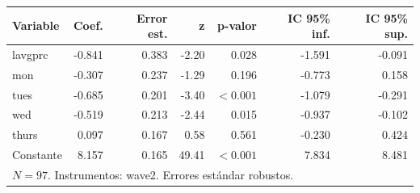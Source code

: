 
\begin{tabular}{lrrrrrr}
\toprule
Variable & Coef. & Error est. & z & p-valor & IC 95\% inf. & IC 95\% sup.\\
\midrule
lavgprc & -0.841 & 0.383 & -2.20 & 0.028 & -1.591 & -0.091\\
mon & -0.307 & 0.237 & -1.29 & 0.196 & -0.773 & 0.158\\
tues & -0.685 & 0.201 & -3.40 & $<0.001$ & -1.079 & -0.291\\
wed & -0.519 & 0.213 & -2.44 & 0.015 & -0.937 & -0.102\\
thurs & 0.097 & 0.167 & 0.58 & 0.561 & -0.230 & 0.424\\
Constante & 8.157 & 0.165 & 49.41 & $<0.001$ & 7.834 & 8.481\\
\midrule
\multicolumn{7}{l}{$N=97$. Instrumentos: wave2. Errores estándar robustos.}\\
\bottomrule
\end{tabular}
